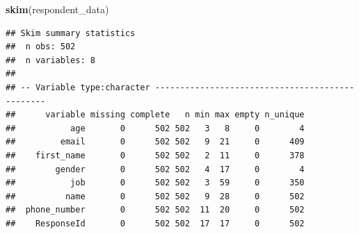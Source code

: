 \documentclass[]{book}
\newenvironment{Shaded}{\begin{snugshade}}{\end{snugshade}}
\newcommand{\KeywordTok}[1]{\textcolor[rgb]{0.13,0.29,0.53}{\textbf{#1}}}
\newcommand{\NormalTok}[1]{#1}
\begin{document}
\begin{Shaded}
\begin{Highlighting}[]
\KeywordTok{skim}\NormalTok{(respondent_data)}
\end{Highlighting}
\end{Shaded}

\begin{verbatim}
## Skim summary statistics
##  n obs: 502 
##  n variables: 8 
## 
## -- Variable type:character ------------------------------------------------
##      variable missing complete   n min max empty n_unique
##           age       0      502 502   3   8     0        4
##         email       0      502 502   9  21     0      409
##    first_name       0      502 502   2  11     0      378
##        gender       0      502 502   4  17     0        4
##           job       0      502 502   3  59     0      350
##          name       0      502 502   9  28     0      502
##  phone_number       0      502 502  11  20     0      502
##    ResponseId       0      502 502  17  17     0      502
\end{verbatim}


\end{document}

